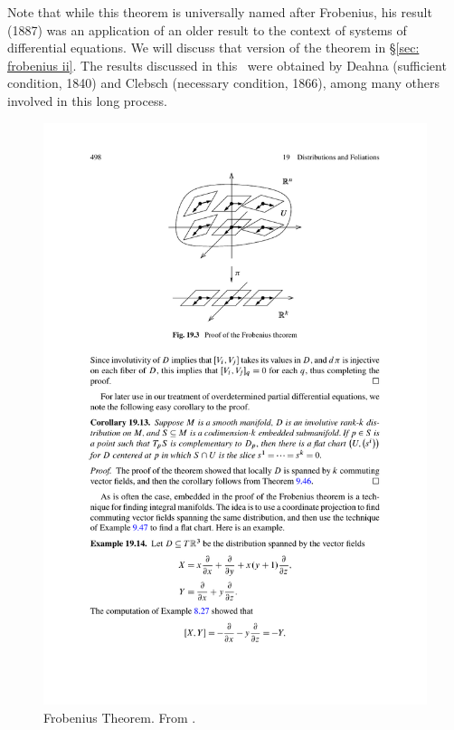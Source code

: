 \begin{hrem*}
    Note that while this theorem is universally named after Frobenius, his result (1887) was an application of an older result to the context of systems of differential equations. We will discuss that version of the theorem in \S\ref{sec: frobenius ii}. The results discussed in this \sect\ were obtained by Deahna (sufficient condition, 1840) and Clebsch (necessary condition, 1866), among many others involved in this long process.
\end{hrem*}

\begin{figure}[tp]
    \centering
    \includegraphics[scale=0.8]{figures/frobenius_1.pdf}
    \caption{Frobenius Theorem. From \cite{Lee}.}
    \label{fig: frobenius1}
\end{figure}

